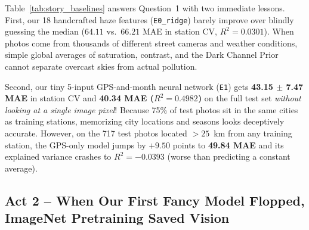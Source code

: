 \documentclass[conference]{IEEEtran}
\begin{document}
Table~\ref{tab:story_baselines} answers Question~1 with two immediate lessons.
First, our 18 handcrafted haze features (\texttt{E0\_ridge}) barely improve over
blindly guessing the median ($64.11$ vs.\ $66.21$ MAE in station CV,
$R^2 = 0.0301$). When photos come from thousands of different street cameras and
weather conditions, simple global averages of saturation, contrast, and the Dark
Channel Prior cannot separate overcast skies from actual pollution.

Second, our tiny 5-input GPS-and-month neural network (\texttt{E1}) gets
\textbf{43.15 $\pm$ 7.47 MAE} in station CV and \textbf{40.34 MAE
($R^2 = 0.4982$)} on the full test set \textit{without looking at a single image
pixel}! Because 75\% of test photos sit in the same cities as training stations,
memorizing city locations and seasons looks deceptively accurate. However, on
the 717 test photos located $> 25$~km from any training station, the GPS-only
model jumps by $+9.50$ points to \textbf{49.84 MAE} and its explained variance
crashes to \textbf{$R^2 = -0.0393$} (worse than predicting a constant average).

\subsection{
  Act 2 -- When Our First Fancy Model Flopped, ImageNet Pretraining Saved Vision
}
\label{subsec:act2_backbones}
\end{document}
